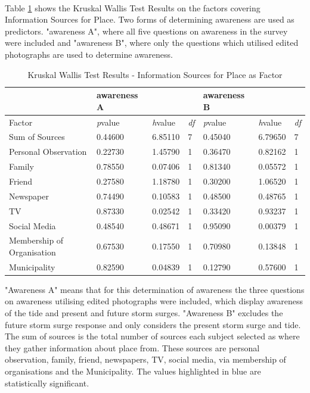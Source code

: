 \paragraph{}

Table \ref{kw_test_info_place} shows the Kruskal Wallis Test Results on the factors covering Information Sources for Place. Two forms of determining awareness are used as predictors. "awareness A", where all five questions on awareness in the survey were included and "awareness B", where only the questions which utilised edited photographs are used to determine awareness.

\begin{table}[H]
    \centering
    \begin{tabular}{|l|l|l|l|l|l|l|}
    \hline
       & \textbf{awareness A} & ~ & ~ & \textbf{awareness B} & ~ & ~ \\ \hline
       Factor &\textit{p}value &\textit{h}value & \textit{df} &\textit{p}value &\textit{h}value & \textit{df} \\ \hline
        Sum of Sources  & 0.44600 & 6.85110 & 7 & 0.45040 & 6.79650 & 7 \\ \hline
        Personal Observation & 0.22730 & 1.45790 & 1 & 0.36470 & 0.82162 & 1 \\ \hline
        Family & 0.78550 & 0.07406 & 1 & 0.81340 & 0.05572 & 1 \\ \hline
        Friend & 0.27580 & 1.18780 & 1 & 0.30200 & 1.06520 & 1 \\ \hline
        Newspaper & 0.74490 & 0.10583 & 1 & 0.48500 & 0.48765 & 1 \\ \hline
        TV & 0.87330 & 0.02542 & 1 & 0.33420 & 0.93237 & 1 \\ \hline
        Social Media & 0.48540 & 0.48671 & 1 & 0.95090 & 0.00379 & 1 \\ \hline
        Membership of Organisation  & 0.67530 & 0.17550 & 1 & 0.70980 & 0.13848 & 1 \\ \hline
        Municipality & 0.82590 & 0.04839 & 1 & 0.12790 & 0.57600 & 1 \\ \hline
        \hline
    \end{tabular}
    \caption{Kruskal Wallis Test Results - Information Sources for Place as Factor}{  "Awareness A" means that for this determination of awareness the three questions on awareness utilising edited photographs were included, which display awareness of the tide and present and future storm surges.  "Awareness B" excludes the future storm surge response and only considers the present storm surge and tide.  The sum of sources is the total number of sources each subject selected as where they gather information about place from. These sources are personal observation, family, friend, newspapers, TV, social media, via membership of organisations and the Municipality. The values highlighted in blue are statistically significant. }
    \label{kw_test_info_place}
\end{table}

